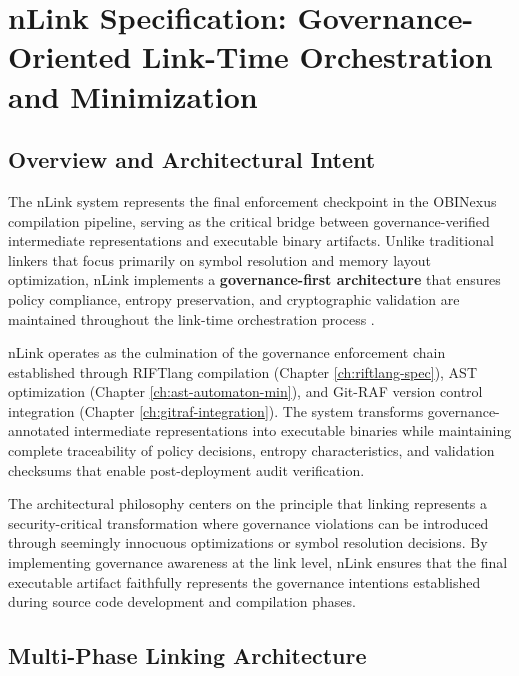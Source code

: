 \chapter{nLink Specification: Governance-Oriented Link-Time Orchestration and Minimization}
\label{ch:nlink-specification}

\section{Overview and Architectural Intent}

The nLink system represents the final enforcement checkpoint in the OBINexus compilation pipeline, serving as the critical bridge between governance-verified intermediate representations and executable binary artifacts. Unlike traditional linkers that focus primarily on symbol resolution and memory layout optimization, nLink implements a \textbf{governance-first architecture} that ensures policy compliance, entropy preservation, and cryptographic validation are maintained throughout the link-time orchestration process \cite{TODO:nlink-architecture-spec}.

nLink operates as the culmination of the governance enforcement chain established through RIFTlang compilation (Chapter \ref{ch:riftlang-spec}), AST optimization (Chapter \ref{ch:ast-automaton-min}), and Git-RAF version control integration (Chapter \ref{ch:gitraf-integration}). The system transforms governance-annotated intermediate representations into executable binaries while maintaining complete traceability of policy decisions, entropy characteristics, and validation checksums that enable post-deployment audit verification.

The architectural philosophy centers on the principle that linking represents a security-critical transformation where governance violations can be introduced through seemingly innocuous optimizations or symbol resolution decisions. By implementing governance awareness at the link level, nLink ensures that the final executable artifact faithfully represents the governance intentions established during source code development and compilation phases.

\section{Multi-Phase Linking Architecture}

